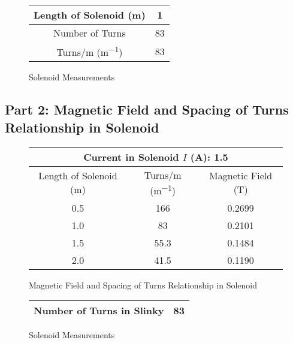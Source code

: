 \documentclass[article, 12pt]{article}
\begin{document}
        \begin{figure}[H]
            \centering
            \begin{tabular}{|c|c|}
               \hline
               Length of Solenoid (\si{\meter}) & 1 \\ 
               \hline
               Number of Turns & 83 \\
               \hline
               Turns/\si{\meter} (\si{\meter^{-1}}) & 83 \\
               \hline
            \end{tabular}
            \caption{Solenoid Measurements}
            \label{fig:solenoid}
        \end{figure}
     \subsection{Part 2: Magnetic Field and Spacing of Turns Relationship in Solenoid}
     \begin{figure}[H]
         \centering
         \begin{tabular}{|c|c|c|}
            \hline
            \multicolumn{3}{|c|}{Current in Solenoid $I$ (\si{\ampere}): 1.5}\\
            \hline
            Length of Solenoid (\si{\meter}) & Turns/\si{\meter} (\si{\meter^{-1}}) & Magnetic Field (\si{\tesla})\\
            \hline
            0.5 & 166 & 0.2699 \\
            1.0 & 83 & 0.2101 \\
            1.5 & 55.3 & 0.1484 \\
            2.0 & 41.5 & 0.1190 \\
            \hline
         \end{tabular}
         \caption{Magnetic Field and Spacing of Turns Relationship in Solenoid}
         \label{fig:spacing}
     \end{figure}

     \begin{figure}[H]
         \centering
         \begin{tabular}{|c|c|}
            \hline
            Number of Turns in Slinky & 83 \\
            \hline
         \end{tabular}
         \caption{Solenoid Measurements}
         \label{fig:slinky}
     \end{figure}
\end{document}
